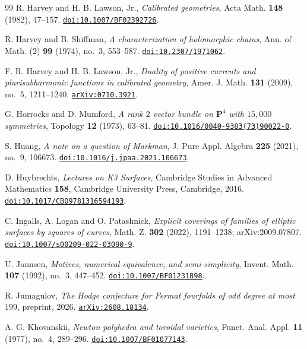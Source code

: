 \begin{thebibliography}{99}
R. Harvey and H. B. Lawson, Jr.,
\emph{Calibrated geometries},
Acta Math. \textbf{148} (1982), 47--157.
\href{https://doi.org/10.1007/BF02392726}{\texttt{doi:10.1007/BF02392726}}.

R. Harvey and B. Shiffman,
\emph{A characterization of holomorphic chains},
Ann. of Math. (2) \textbf{99} (1974), no.~3, 553--587.
\href{https://doi.org/10.2307/1971062}{\texttt{doi:10.2307/1971062}}.

F. R. Harvey and H. B. Lawson, Jr.,
\emph{Duality of positive currents and plurisubharmonic functions in
calibrated geometry},
Amer. J. Math. \textbf{131} (2009), no.~5, 1211--1240.
\href{https://arxiv.org/abs/0710.3921}{\texttt{arXiv:0710.3921}}.

G. Horrocks and D. Mumford,
\emph{A rank $2$ vector bundle on $\mathbf{P}^{4}$ with $15{,}000$ symmetries},
Topology \textbf{12} (1973), 63--81.
\href{https://doi.org/10.1016/0040-9383(73)90022-0}{\texttt{doi:10.1016/0040-9383(73)90022-0}}.

S. Huang,
\emph{A note on a question of Markman},
J. Pure Appl. Algebra \textbf{225} (2021), no.~9, 106673.
\href{https://doi.org/10.1016/j.jpaa.2021.106673}{\texttt{doi:10.1016/j.jpaa.2021.106673}}.

D. Huybrechts,
\emph{Lectures on K3 Surfaces},
Cambridge Studies in Advanced Mathematics \textbf{158},
Cambridge University Press, Cambridge, 2016.
\href{https://doi.org/10.1017/CBO9781316594193}{\texttt{doi:10.1017/CBO9781316594193}}.

C. Ingalls, A. Logan and O. Patashnick,
\emph{Explicit coverings of families of elliptic surfaces by squares of
curves},
Math. Z. \textbf{302} (2022), 1191--1238; arXiv:2009.07807.
\href{https://doi.org/10.1007/s00209-022-03090-9}{\texttt{doi:10.1007/s00209-022-03090-9}}.

U. Jannsen,
\emph{Motives, numerical equivalence, and semi-simplicity},
Invent. Math. \textbf{107} (1992), no.~3, 447--452.
\href{https://doi.org/10.1007/BF01231898}{\texttt{doi:10.1007/BF01231898}}.

R. Jumagulov,
\emph{The Hodge conjecture for Fermat fourfolds of odd degree at most
$199$},
preprint, 2026.
\href{https://arxiv.org/abs/2608.18134}{\texttt{arXiv:2608.18134}}.

A. G. Khovanskii,
\emph{Newton polyhedra and toroidal varieties},
Funct. Anal. Appl. \textbf{11} (1977), no.~4, 289--296.
\href{https://doi.org/10.1007/BF01077143}{\texttt{doi:10.1007/BF01077143}}.


\end{thebibliography}
